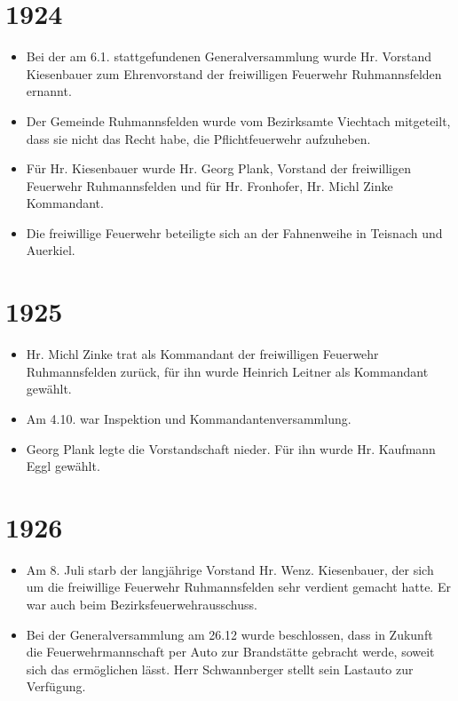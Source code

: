\documentclass[12pt,a4paper]{book}
\begin{document}
\section*{1924}

\begin{itemize}
\item Bei der am 6.1. stattgefundenen Generalversammlung wurde Hr.
Vorstand Kiesenbauer zum Ehrenvorstand der freiwilligen Feuerwehr
Ruhmannsfelden ernannt.

\item Der Gemeinde Ruhmannsfelden wurde vom Bezirksamte Viechtach
mitgeteilt, dass sie nicht das Recht habe, die Pflichtfeuerwehr
aufzuheben.

\item Für Hr. Kiesenbauer wurde Hr. Georg Plank, Vorstand der
freiwilligen Feuerwehr Ruhmannsfelden und für Hr. Fronhofer, Hr. Michl
Zinke Kommandant.

\item Die freiwillige Feuerwehr beteiligte sich an der Fahnenweihe in
Teisnach und Auerkiel.
\end{itemize}

\section*{1925}

\begin{itemize}
\item Hr. Michl Zinke trat als Kommandant der freiwilligen Feuerwehr
Ruhmannsfelden zurück, für ihn wurde Heinrich Leitner als Kommandant
gewählt.

\item Am 4.10. war Inspektion und Kommandantenversammlung.

\item Georg Plank legte die Vorstandschaft nieder. Für ihn wurde Hr.
Kaufmann Eggl gewählt.
\end{itemize}

\section*{1926}

\begin{itemize}
\item Am 8. Juli starb der langjährige Vorstand Hr. Wenz. Kiesenbauer,
der sich um die freiwillige Feuerwehr Ruhmannsfelden sehr verdient
gemacht hatte. Er war auch beim Bezirksfeuerwehrausschuss.

\item Bei der Generalversammlung am 26.12 wurde beschlossen, dass in
Zukunft die Feuerwehrmannschaft per Auto zur Brandstätte gebracht werde,
soweit sich das ermöglichen lässt. Herr Schwannberger stellt sein
Lastauto zur Verfügung.
\end{itemize}
\end{document}
